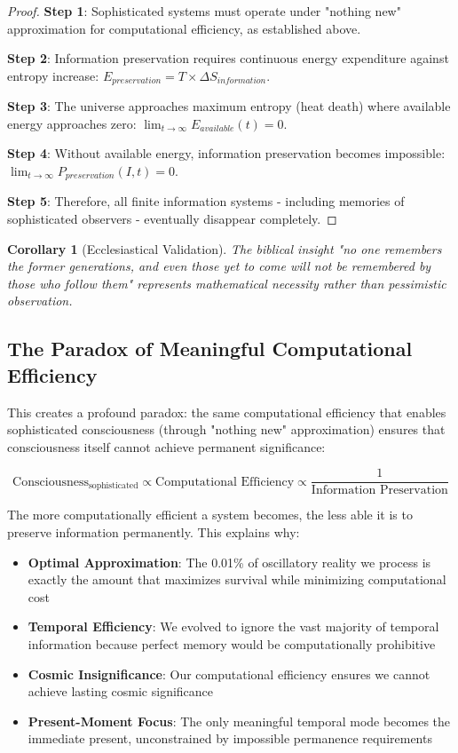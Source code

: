 \documentclass[11pt]{article}
\newtheorem{corollary}[theorem]{Corollary}
\theoremstyle{remark}
\begin{document}
\begin{proof}
\textbf{Step 1}: Sophisticated systems must operate under "nothing new" approximation for computational efficiency, as established above.

\textbf{Step 2}: Information preservation requires continuous energy expenditure against entropy increase: $E_{preservation} = T \times \Delta S_{information}$.

\textbf{Step 3}: The universe approaches maximum entropy (heat death) where available energy approaches zero: $\lim_{t \to \infty} E_{available}(t) = 0$.

\textbf{Step 4}: Without available energy, information preservation becomes impossible: $\lim_{t \to \infty} P_{preservation}(I,t) = 0$.

\textbf{Step 5}: Therefore, all finite information systems - including memories of sophisticated observers - eventually disappear completely.
\end{proof}

\begin{corollary}[Ecclesiastical Validation]
The biblical insight "no one remembers the former generations, and even those yet to come will not be remembered by those who follow them" represents mathematical necessity rather than pessimistic observation.
\end{corollary}

\subsection{The Paradox of Meaningful Computational Efficiency}

This creates a profound paradox: the same computational efficiency that enables sophisticated consciousness (through "nothing new" approximation) ensures that consciousness itself cannot achieve permanent significance:

$$\text{Consciousness}_{\text{sophisticated}} \propto \text{Computational Efficiency} \propto \frac{1}{\text{Information Preservation}}$$

The more computationally efficient a system becomes, the less able it is to preserve information permanently. This explains why:

\begin{itemize}
\item \textbf{Optimal Approximation}: The 0.01\% of oscillatory reality we process is exactly the amount that maximizes survival while minimizing computational cost
\item \textbf{Temporal Efficiency}: We evolved to ignore the vast majority of temporal information because perfect memory would be computationally prohibitive
\item \textbf{Cosmic Insignificance}: Our computational efficiency ensures we cannot achieve lasting cosmic significance
\item \textbf{Present-Moment Focus}: The only meaningful temporal mode becomes the immediate present, unconstrained by impossible permanence requirements
\end{itemize}
\end{document}
